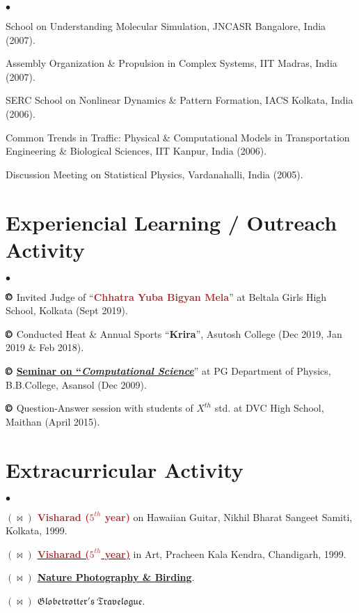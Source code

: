 \documentclass[margin,line]{res}
\newenvironment{list2}{
  \begin{list}{$\bullet$}{%
      \setlength{\itemsep}{0in}
      \setlength{\parsep}{0in} \setlength{\parskip}{0in}
      \setlength{\topsep}{0in} \setlength{\partopsep}{0in} 
      \setlength{\leftmargin}{0.2in}}}{\end{list}}
\begin{document}
\begin{resume}
\begin{list2}
\item {\small School on Understanding Molecular Simulation, JNCASR Bangalore, India (2007).} 
\item {\small Assembly Organization \& Propulsion in Complex Systems, IIT Madras, India (2007).}
\item {\small SERC School on Nonlinear Dynamics \& Pattern Formation, IACS Kolkata, India (2006).} 
\item {\small Common Trends in Traffic: Physical \& Computational Models in Transportation Engineering \& Biological Sciences, IIT Kanpur, 
      India (2006).} 
\item {\small Discussion Meeting on Statistical Physics, Vardanahalli, India (2005).}
\end{list2}

\section{\sc Experiencial Learning / Outreach Activity}
\begin{list2}

\item[$\pmb\copyright$] {\small Invited Judge of ``\textcolor{brown}{\sf \bf Chhatra Yuba Bigyan Mela}'' at Beltala Girls High School, 
      Kolkata (Sept 2019).}  
\item[$\pmb\copyright$] {\small Conducted Heat \& Annual Sports ``\textcolor{auburn}{\sc \bf Krira}'', Asutosh College (Dec 2019, Jan 2019 \& Feb 2018).}
\item[$\pmb\copyright$] {\small \href{https://www.slideshare.net/AmitBhattacharjee14/computational-liquid-crystal-physics}{\bf Seminar on 
      ``\textcolor{skblue}{\it Computational Science}}'' at PG Department of Physics, B.B.College, Asansol (Dec 2009).}
\item[$\pmb\copyright$] {\small Question-Answer session with students of $X^{th}$ std. at DVC High School, Maithan (April 2015).}
\end{list2}

\section{\sc Extracurricular Activity} 
\begin{list2}
\item[$\pmb{(\Join)}$] \textcolor{brown}{\bf Visharad ($5^{th}$ year)} on Hawaiian Guitar, Nikhil Bharat Sangeet Samiti, Kolkata, 1999. 
\item[$\pmb{(\Join)}$] \href{https://amitbny.github.io/akb.github.io/picture/chitrabisharad.pdf}{\textcolor{brown}{\bf Visharad (\bf $5^{th}$ 
                       year)}} in Art, Pracheen Kala Kendra, Chandigarh, 1999. 
\item[$\pmb{(\Join)}$] \href{https://500px.com/amitbhattacharjee}{\bf Nature Photography \& Birding}. 
\item[$\pmb{(\Join)}$] \href{https://www.tripoto.com/profile/amitbhattacharjee}{$\mathfrak{Globetrotter's ~Travelogue}$}. 
\end{list2}

\end{resume}
\end{document}
